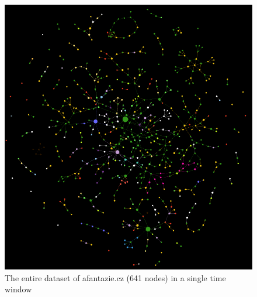 \begin{figure}[p]
    \includegraphics[width=130mm, keepaspectratio]{img/afantzazie_production_dataset_641_nodes.png}
    \caption{The entire dataset of afantazie.cz (641 nodes) in a single time window}
    \label{obr:afantzazie_production_dataset_640_nodes}
\end{figure}

